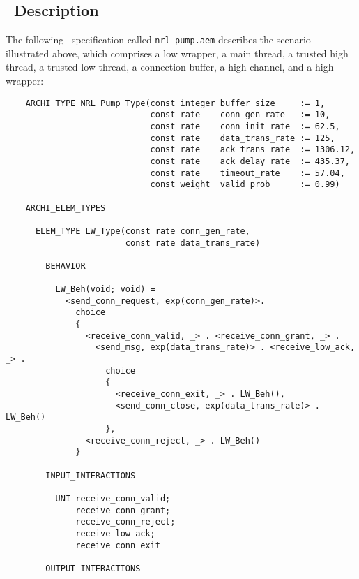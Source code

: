 \subsection{\aemilia\ Description}\label{nrl_pump}

The following \aemilia\ specification called {\tt nrl\_pump.aem} describes the scenario illustrated above,
which comprises a low wrapper, a main thread, a trusted high thread, a trusted low thread, a connection
buffer, a high channel, and a high wrapper:

	\begin{verbatim}
    ARCHI_TYPE NRL_Pump_Type(const integer buffer_size     := 1,
                             const rate    conn_gen_rate   := 10,
                             const rate    conn_init_rate  := 62.5,
                             const rate    data_trans_rate := 125,
                             const rate    ack_trans_rate  := 1306.12,
                             const rate    ack_delay_rate  := 435.37,
                             const rate    timeout_rate    := 57.04,
                             const weight  valid_prob      := 0.99)

    ARCHI_ELEM_TYPES

      ELEM_TYPE LW_Type(const rate conn_gen_rate,
                        const rate data_trans_rate)

        BEHAVIOR

          LW_Beh(void; void) =
            <send_conn_request, exp(conn_gen_rate)>.
              choice
              {
                <receive_conn_valid, _> . <receive_conn_grant, _> .
                  <send_msg, exp(data_trans_rate)> . <receive_low_ack, _> .
                    choice
                    {
                      <receive_conn_exit, _> . LW_Beh(),
                      <send_conn_close, exp(data_trans_rate)> . LW_Beh()
                    },
                <receive_conn_reject, _> . LW_Beh()
              }

        INPUT_INTERACTIONS

          UNI receive_conn_valid;
              receive_conn_grant;
              receive_conn_reject;
              receive_low_ack;
              receive_conn_exit

        OUTPUT_INTERACTIONS


\end{verbatim}
